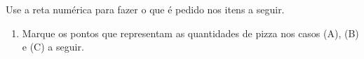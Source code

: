 \begin{atividade}{}

Use a reta numérica para fazer o que é pedido nos itens a seguir.
\vspace{.2cm}

\begin{center}
\end{center}

\begin{enumerate} [\quad a)] %
\item    Marque os pontos que representam as quantidades de pizza nos casos (A), (B) e (C) a seguir.
  
\begin{center}
\begin{tabular}{>{\centering\arraybackslash}m{} >{\centering\arraybackslash}m{} >{\centering\arraybackslash}m{}}



\end{tabular}
\end{center}
\end{enumerate}
\end{atividade}
